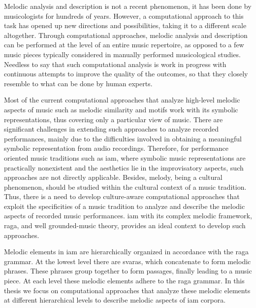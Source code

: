 Melodic analysis and description is not a recent phenomenon, it has been done by musicologists for hundreds of years. However, a computational approach to this task has opened up new directions and possibilities, taking it to a different scale altogether. Through computational approaches, melodic analysis and description can be performed at the level of an entire music repertoire, as opposed to a few music pieces typically considered in manually performed musicological studies. Needless to say that such computational analysis is work in progress with continuous attempts to improve the quality of the outcomes, so that they closely resemble to what can be done by human experts.

Most of the current computational approaches that analyze high-level melodic aspects of music such as melodic similarity and motifs work with its symbolic representations, thus covering only a particular view of music. There are significant challenges in extending such approaches to analyze recorded performances, mainly due to the difficulties involved in obtaining a meaningful symbolic representation from audio recordings. Therefore, for performance oriented music traditions such as \gls{iam}, where symbolic music representations are practically nonexistent and the aesthetics lie in the improvisatory aspects, such approaches are not directly applicable. Besides, melody, being a cultural phenomenon, should be studied within the cultural context of a music tradition. Thus, there is a need to develop culture-aware computational approaches that exploit the specificities of a music tradition to analyze and describe the melodic aspects of recorded music performances. \gls{iam} with its complex melodic framework, \gls{raga}, and well grounded-music theory, provides an ideal context to develop such approaches.

Melodic elements in \gls{iam} are hierarchically organized in accordance with the \gls{raga} grammar. At the lowest level there are \glspl{svara}, which concatenate to form melodic phrases. These phrases group together to form passages, finally leading to a music piece. At each level these melodic elements adhere to the \gls{raga} grammar. In this thesis we focus on computational approaches that analyze these melodic elements at different hierarchical levels to describe melodic aspects of \gls{iam} corpora. 

